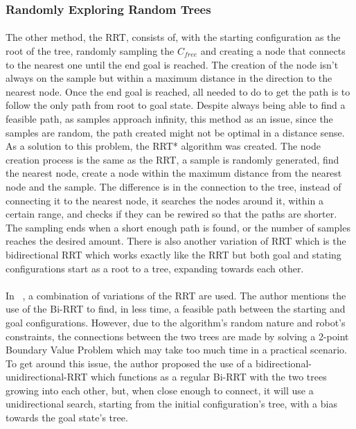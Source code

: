 \subsubsection{Randomly Exploring Random Trees}
\label{subsubsec:RRT}
\paragraph{}The other method, the \gls{RRT}, consists of, with the starting configuration as the root of the tree, randomly sampling the $C_{free}$ and creating a node that 
connects to the nearest one until the end goal is reached. The creation of the node isn’t always on the sample but within a maximum distance in the direction 
to the nearest node. Once the end goal is reached, all needed to do to get the path is to follow the only path from root to goal state. 
Despite always being able to find a feasible path, as samples approach infinity, this method as an issue, since the samples are random, the path created might 
not be optimal in a distance sense. As a solution to this problem, the RRT* algorithm was created. The node creation process is the same as the \gls{RRT}, a sample 
is randomly generated, find the nearest node, create a node within the maximum distance from the nearest node and the sample. The difference is in the 
connection to the tree, instead of connecting it to the nearest node, it searches the nodes around it, within a certain range, and checks if they can be 
rewired so that the paths are shorter. The sampling ends when a short enough path is found, or the number of samples reaches the desired amount. 
There is also another variation of \gls{RRT} which is the bidirectional \gls{RRT} which works exactly like the \gls{RRT} but both goal and stating configurations start 
as a root to a tree, expanding towards each other.

\paragraph{}In ~\cite{9638379}, a combination of variations of the \gls{RRT} are used. The author mentions the use of the Bi-RRT to find, in less time, a 
feasible path between the starting and goal configurations. However, due to the algorithm’s random nature and robot’s constraints, 
the connections between the two trees are made by solving a 2-point Boundary Value Problem which may take too much time in a practical scenario. 
To get around this issue, the author proposed the use of a bidirectional-unidirectional-RRT which functions as a regular Bi-RRT with the two trees growing into each other, 
but, when close enough to connect, it will use a unidirectional search, starting from the initial configuration’s tree, with a bias towards the goal state’s tree.

